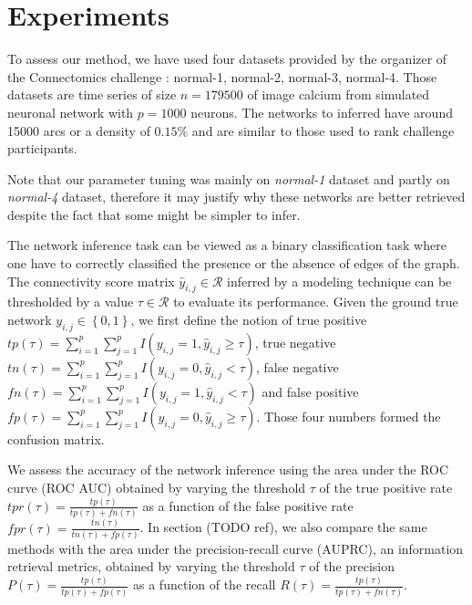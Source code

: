 \documentclass[wcp]{jmlr}
\begin{document}

\section{Experiments}

To assess our method, we have used four datasets provided by the organizer
of the Connectomics challenge : normal-1, normal-2, normal-3, normal-4. Those
datasets are time series of size $n=179500$ of image calcium from simulated
neuronal network \cite{stetter2012model} with $p=1000$ neurons. The networks
to inferred have around 15000 arcs or a density of $0.15\%$ and are similar to those
used to rank challenge participants.

Note that our parameter tuning was mainly on \textit{normal-1} dataset and
partly on \textit{normal-4} dataset, therefore it may justify why these
networks are better retrieved despite the fact that some might be simpler to
infer.

The network inference task can be viewed as a binary classification task
where one have to correctly classified the presence or the absence of edges
of the graph. The connectivity score matrix
$\hat{y}_{i,j} \in \mathcal{R}$ inferred by a modeling technique
can be thresholded by a value $\tau \in \mathcal{R}$ to evaluate its performance.
Given the ground true network $y_{i,j} \in \left\{0, 1\right\}$, we first define the notion of
true positive $tp(\tau) = \sum_{i=1}^p \sum_{j=1}^p I(y_{i,j} = 1, \hat{y}_{i,j} \geq \tau)$,
true negative $tn(\tau) = \sum_{i=1}^p \sum_{j=1}^p I(y_{i,j} = 0, \hat{y}_{i,j} < \tau)$,
false negative $fn(\tau) = \sum_{i=1}^p \sum_{j=1}^p I(y_{i,j} = 1, \hat{y}_{i,j} < \tau)$ and
false positive $fp(\tau) = \sum_{i=1}^p \sum_{j=1}^p I(y_{i,j} = 0, \hat{y}_{i,j} \geq \tau)$.
Those four numbers formed the confusion matrix.

We assess the accuracy of the network inference using the area under
the ROC curve (ROC AUC) obtained by varying the threshold
$\tau$ of the true positive rate $tpr(\tau) = \frac{tp(\tau)}{tp(\tau) + fn(\tau)}$
as a function of the false positive rate
$fpr(\tau) = \frac{tn(\tau)}{tn(\tau) + fp(\tau)}$. In section (TODO ref),
we also compare the same methods with the area under the precision-recall
curve (AUPRC), an information retrieval metrics, obtained by varying the threshold
$\tau$ of the precision $P(\tau) = \frac{tp(\tau)}{tp(\tau) + fp(\tau)}$
as a function of the recall $R(\tau) = \frac{tp(\tau)}{tp(\tau) + fn(\tau)}$.
\end{document}
